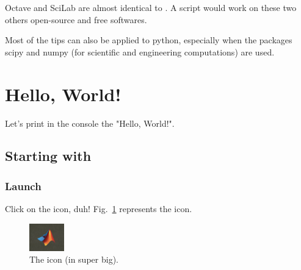 		Octave and SciLab are almost identical to \matlab. A \matlab script would work on these two others open-source and free softwares.

		Most of the tips can also be applied to python, especially when the packages scipy and numpy (for scientific and engineering computations) are used.


\section{Hello, World!}
	Let's print in the console the "Hello, World!".
	\subsection{Starting with \matlab}
		\subsubsection{Launch \matlab}
		Click on the icon, duh! Fig.~\ref{fig-matlab_icon} represents the icon.
		\begin{figure}[h!]
			\center
			\includegraphics[width=0.45\linewidth]{./fig/icon_matlab.PNG}
			\caption{
				The \matlab icon (in super big).
			}
			\label{fig-matlab_icon}
		\end{figure}


